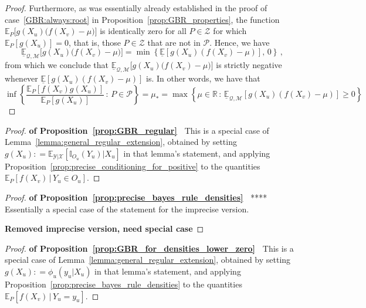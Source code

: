 \documentclass[twoside,11pt]{article}
\newcommand{\reals}{\mathbb{R}}
\newcommand{\states}{\mathcal{X}}
\newcommand{\observs}{\mathcal{Y}}
\newcommand{\lexp}{\underline{\mathbb{E}}_{\rateset,\mathcal{M}}}
\newcommand{\ind}[1]{\mathbb{I}_{#1}}
\newcommand{\rateset}{\mathcal{Q}}
\newcommand{\coloneqq}{:\!=}
\begin{document}
\begin{proof}
Furthermore, as was essentially already established in the proof of case~\ref{GBR:always:root} in Proposition~\ref{prop:GBR_properties}, the function $\mathbb{E}_P\bigl[g(X_u)\bigl(f(X_v)-\mu\bigr)\bigr]$ is identically zero for all $P\in\mathcal{Z}$ for which $\mathbb{E}_P[g(X_u)]=0$, that is, those $P\in\mathcal{Z}$ that are not in $\mathcal{P}$. Hence, we have 
\begin{equation*}
\lexp\bigl[g(X_u)\bigl(f(X_v)-\mu\bigr)\bigr] = \min\left\{\underline{\mathbb{E}}[g(X_u)(f(X_v) - \mu)],\,0 \right\}\,,
\end{equation*}
from which we conclude that $\lexp\bigl[g(X_u)\bigl(f(X_v)-\mu\bigr)\bigr]$ is strictly negative whenever $\underline{\mathbb{E}}[g(X_u)(f(X_v) - \mu)]$ is. In other words, we have that
\begin{equation*}
\inf\left\{\frac{\mathbb{E}_P[f(X_v)g(X_u)]}{\mathbb{E}_P[g(X_u)]}\,:\,P\in\mathcal{P}\right\} = \mu_* = \max\left\{ \mu\in\reals\,:\, \lexp[g(X_u)(f(X_v) - \mu)] \geq 0 \right\}
\end{equation*}
\end{proof}

\begin{proof}{\bf of Proposition~\ref{prop:GBR_regular}~}
This is a special case of Lemma~\ref{lemma:general_regular_extension}, obtained by setting $g(X_u)\coloneqq \mathbb{E}_{\observs\vert\states}[\ind{O_u}(Y_u)\vert X_u]$ in that lemma's statement, and applying Proposition~\ref{prop:precise_conditioning_for_positive} to the quantities $\mathbb{E}_P[f(X_v)\,\vert\,Y_u\in O_u]$.
\end{proof}

\begin{proof}{\bf of Proposition~\ref{prop:precise_bayes_rule_densities}~}
**** Essentially a special case of the statement for the imprecise version.

{\bf Removed imprecise version, need special case}
\end{proof}

\begin{proof}{\bf of Proposition~\ref{prop:GBR_for_densities_lower_zero}~}
This is a special case of Lemma~\ref{lemma:general_regular_extension}, obtained by setting $g(X_u)\coloneqq \phi_u(y_u\vert X_u)$ in that lemma's statement, and applying Proposition~\ref{prop:precise_bayes_rule_densities} to the quantities $\mathbb{E}_P[f(X_v)\,\vert\,Y_u=y_u]$.
\end{proof}
\end{document}
